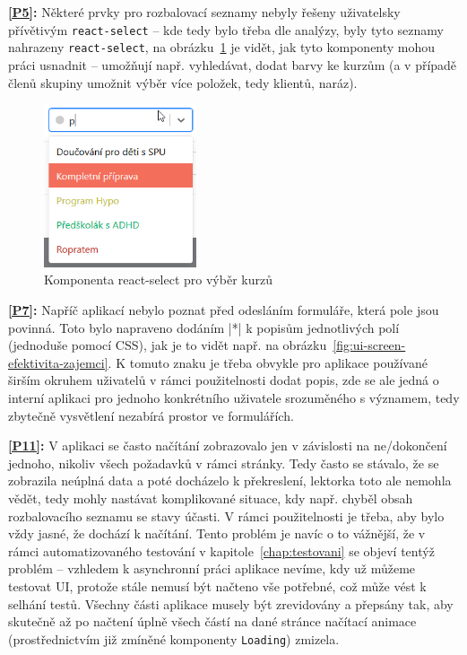 \textbf{\ref{P5}:} Některé prvky pro rozbalovací seznamy nebyly řešeny uživatelsky přívětivým \verb|react-select| -- kde tedy bylo třeba dle analýzy, byly tyto seznamy nahrazeny \verb|react-select|, na obrázku~\ref{fig:ui-screen-select} je vidět, jak tyto komponenty mohou práci usnadnit -- umožňují např. vyhledávat, dodat barvy ke kurzům (a v případě členů skupiny umožnit výběr více položek, tedy klientů, naráz).

\begin{figure}[h]\centering
    \includegraphics[width=0.4\textwidth]{img/ui-screen-select.png}
    \caption{Komponenta react-select pro výběr kurzů}\label{fig:ui-screen-select}
\end{figure}

\textbf{\ref{P7}:} Napříč aplikací nebylo poznat před odesláním formuláře, která pole jsou povinná. Toto bylo napraveno dodáním \cverb|*| k popisům jednotlivých polí (jednoduše pomocí CSS), jak je to vidět např. na obrázku~\ref{fig:ui-screen-efektivita-zajemci}. K tomuto znaku je třeba obvykle pro aplikace používané širším okruhem uživatelů v rámci použitelnosti dodat popis, zde se ale jedná o interní aplikaci pro jednoho konkrétního uživatele srozuměného s významem, tedy zbytečně vysvětlení nezabírá prostor ve formulářích.

\textbf{\ref{P11}:} V aplikaci se často načítání zobrazovalo jen v závislosti na ne/dokončení jednoho, nikoliv všech požadavků v rámci stránky. Tedy často se stávalo, že se zobrazila neúplná data a poté docházelo k překreslení, lektorka toto ale nemohla vědět, tedy mohly nastávat komplikované situace, kdy např. chyběl obsah rozbalovacího seznamu se stavy účasti. V rámci použitelnosti je třeba, aby bylo vždy jasné, že dochází k načítání. Tento problém je navíc o to vážnější, že v rámci automatizovaného testování v kapitole~\ref{chap:testovani} se objeví tentýž problém -- vzhledem k asynchronní práci aplikace nevíme, kdy už můžeme testovat UI, protože stále nemusí být načteno vše potřebné, což může vést k selhání testů. Všechny části aplikace musely být zrevidovány a přepsány tak, aby skutečně až po načtení úplně všech částí na dané stránce načítací animace (prostřednictvím již zmíněné komponenty \verb|Loading|) zmizela.

